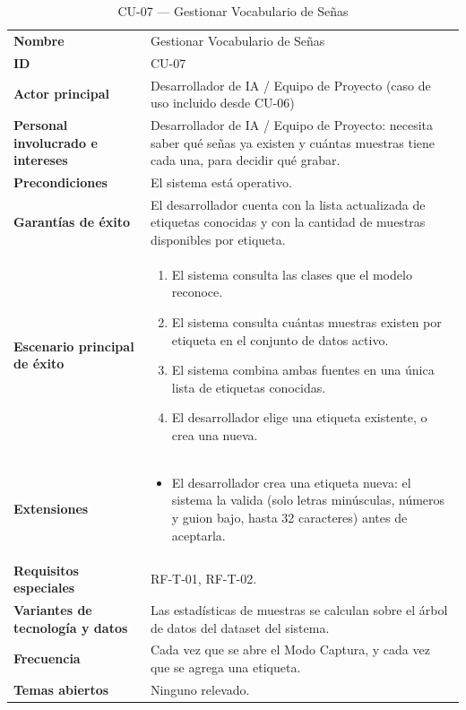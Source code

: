 \begin{longtable}{@{}>{\raggedright\arraybackslash}p{4.1cm} >{\raggedright\arraybackslash}p{\dimexpr\textwidth-4.1cm-2\tabcolsep\relax}@{}}
\caption{CU-07 --- Gestionar Vocabulario de Señas}\\
\toprule
\textbf{Nombre} & Gestionar Vocabulario de Señas \\
\textbf{ID} & CU-07 \\
\textbf{Actor principal} & Desarrollador de IA / Equipo de Proyecto (caso de uso incluido desde CU-06) \\
\textbf{Personal involucrado e intereses} &
Desarrollador de IA / Equipo de Proyecto: necesita saber qué señas ya
existen y cuántas muestras tiene cada una, para decidir qué grabar. \\
\textbf{Precondiciones} & El sistema está operativo. \\
\textbf{Garantías de éxito} &
El desarrollador cuenta con la lista actualizada de etiquetas conocidas y
con la cantidad de muestras disponibles por etiqueta. \\
\textbf{Escenario principal de éxito} &
\begin{enumerate}[leftmargin=*, itemsep=2pt]
    \item El sistema consulta las clases que el modelo reconoce.
    \item El sistema consulta cuántas muestras existen por etiqueta en el
    conjunto de datos activo.
    \item El sistema combina ambas fuentes en una única lista de
    etiquetas conocidas.
    \item El desarrollador elige una etiqueta existente, o crea una
    nueva.
\end{enumerate} \\
\textbf{Extensiones} &
\begin{itemize}[leftmargin=*, itemsep=2pt]
    \item[4a.] El desarrollador crea una etiqueta nueva: el sistema la
    valida (solo letras minúsculas, números y guion bajo, hasta 32
    caracteres) antes de aceptarla.
\end{itemize} \\
\textbf{Requisitos especiales} & RF-T-01, RF-T-02. \\
\textbf{Variantes de tecnología y datos} &
Las estadísticas de muestras se calculan sobre el árbol de datos del
dataset del sistema. \\
\textbf{Frecuencia} &
Cada vez que se abre el Modo Captura, y cada vez que se agrega una
etiqueta. \\
\textbf{Temas abiertos} & Ninguno relevado. \\
\bottomrule
\end{longtable}

